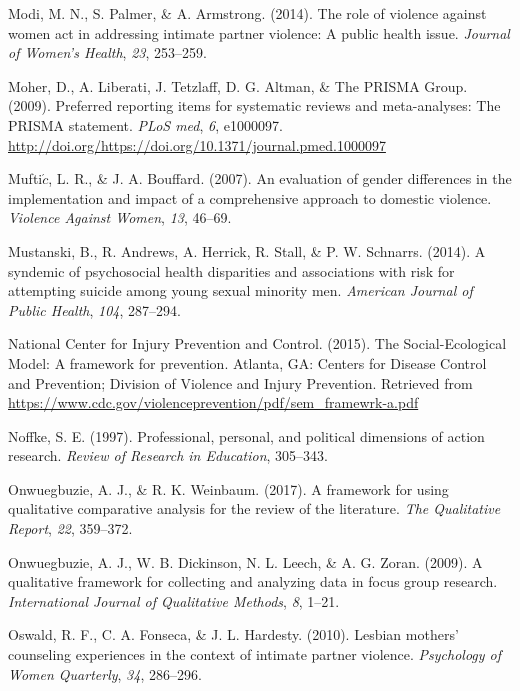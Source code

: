 \documentclass[11pt,]{tufte-book}
\begin{document}
\hypertarget{ref-modi2014role}{}
Modi, M. N., S. Palmer, \& A. Armstrong. (2014). The role of violence
against women act in addressing intimate partner violence: A public
health issue. \emph{Journal of Women's Health}, \emph{23}, 253--259.

\hypertarget{ref-moher2009preferred}{}
Moher, D., A. Liberati, J. Tetzlaff, D. G. Altman, \& The PRISMA Group.
(2009). Preferred reporting items for systematic reviews and
meta-analyses: The PRISMA statement. \emph{PLoS med}, \emph{6},
e1000097.
\url{http://doi.org/https://doi.org/10.1371/journal.pmed.1000097}

\hypertarget{ref-muftic2007evaluation}{}
Mufti\(\acute{c}\), L. R., \& J. A. Bouffard. (2007). An evaluation of
gender differences in the implementation and impact of a comprehensive
approach to domestic violence. \emph{Violence Against Women}, \emph{13},
46--69.

\hypertarget{ref-mustanski2014syndemic}{}
Mustanski, B., R. Andrews, A. Herrick, R. Stall, \& P. W. Schnarrs.
(2014). A syndemic of psychosocial health disparities and associations
with risk for attempting suicide among young sexual minority men.
\emph{American Journal of Public Health}, \emph{104}, 287--294.

\hypertarget{ref-centers2015social}{}
National Center for Injury Prevention and Control. (2015). The
Social-Ecological Model: A framework for prevention. Atlanta, GA:
Centers for Disease Control and Prevention; Division of Violence and
Injury Prevention. Retrieved from
\url{https://www.cdc.gov/violenceprevention/pdf/sem_framewrk-a.pdf}

\hypertarget{ref-noffke1997professional}{}
Noffke, S. E. (1997). Professional, personal, and political dimensions
of action research. \emph{Review of Research in Education}, 305--343.

\hypertarget{ref-onwuegbuzie2017framework}{}
Onwuegbuzie, A. J., \& R. K. Weinbaum. (2017). A framework for using
qualitative comparative analysis for the review of the literature.
\emph{The Qualitative Report}, \emph{22}, 359--372.

\hypertarget{ref-onwuegbuzie2009qualitative}{}
Onwuegbuzie, A. J., W. B. Dickinson, N. L. Leech, \& A. G. Zoran.
(2009). A qualitative framework for collecting and analyzing data in
focus group research. \emph{International Journal of Qualitative
Methods}, \emph{8}, 1--21.

\hypertarget{ref-oswald2010lesbian}{}
Oswald, R. F., C. A. Fonseca, \& J. L. Hardesty. (2010). Lesbian
mothers' counseling experiences in the context of intimate partner
violence. \emph{Psychology of Women Quarterly}, \emph{34}, 286--296.
\end{document}
